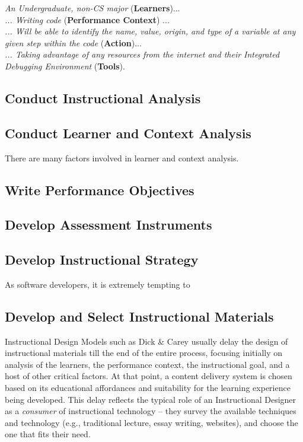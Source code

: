 \documentclass{acm_proc_article-sp}
\begin{document}
\textit{An Undergraduate, non-CS major} (\textbf{Learners})...\\
\textit{... Writing code} (\textbf{Performance Context}) ...\\
\textit{... Will be able to identify the name, value, origin, and type of a variable at any given step within the code} (\textbf{Action})... \\
\textit{... Taking advantage of any resources from the internet and their Integrated Debugging Environment} (\textbf{Tools}).

\subsection{Conduct Instructional Analysis}


\subsection{Conduct Learner and Context Analysis}

There are many factors involved in learner and context analysis.

\subsection{Write Performance Objectives}
\subsection{Develop Assessment Instruments}
\subsection{Develop Instructional Strategy}
As software developers, it is extremely tempting to 
\subsection{Develop and Select Instructional Materials}
Instructional Design Models such as Dick \& Carey usually delay the design of instructional materials till the end of the entire process, focusing initially on analysis of the learners, the performance context, the instructional goal, and a host of other critical factors. At that point, a content delivery system is chosen based on its educational affordances and suitability for the learning experience being developed. This delay reflects the typical role of an Instructional Designer as a \textit{consumer} of instructional technology -- they survey the available techniques and technology (e.g., traditional lecture, essay writing, websites), and choose the one that fits their need.
\end{document}
